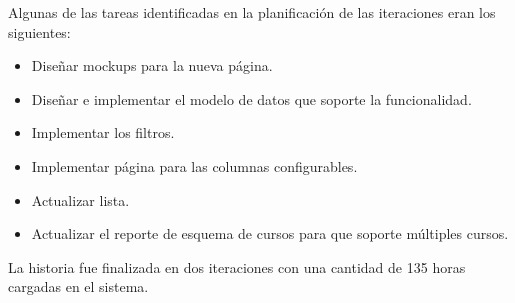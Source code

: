 Algunas de las tareas identificadas en la planificación de las iteraciones eran los siguientes:
\begin{itemize}
	\item Diseñar mockups para la nueva página.
	\item Diseñar e implementar el modelo de datos que soporte la funcionalidad.
	\item Implementar los filtros.
	\item Implementar página para las columnas configurables.
	\item Actualizar lista.
	\item Actualizar el reporte de esquema de cursos para que soporte múltiples cursos.
\end{itemize}

La historia fue finalizada en dos iteraciones con una cantidad de 135 horas cargadas en el sistema.